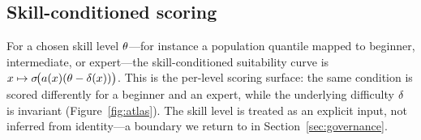 \subsection{Skill-conditioned scoring}

For a chosen skill level $\theta$---for instance a population quantile mapped to
beginner, intermediate, or expert---the skill-conditioned suitability curve is
$x \mapsto \sigma\!\big(a(x)(\theta - \delta(x))\big)$. This is
the per-level scoring surface: the same condition is scored differently for a
beginner and an expert, while the underlying difficulty $\delta$ is invariant
(Figure~\ref{fig:atlas}). The skill level is treated as an explicit input, not
inferred from identity---a boundary we return to in Section~\ref{sec:governance}.
